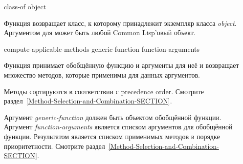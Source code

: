 \begin{defun}[Функция]
class-of object

Функция  возвращает класс, к которому принадлежит экземпляр класса
\emph{object}.
Аргументом для  может быть любой Common Lisp'овый объект.
\end{defun}

\begin{defun}[Функция]
compute-applicable-methods generic-function function-arguments

Функция  принимает обобщённую функцию и
аргументы для неё и возвращает множество методов, которые применимы для данных
аргументов.

Методы сортируются в соответствии с precedence order.
Смотрите раздел~\ref{Method-Selection-and-Combination-SECTION}.

Аргумент \emph{generic-function} должен быть объектом обобщённой функции.
Аргумент \emph{function-arguments} является списком аргументов для обобщённой
функции.
Результатом является списком применимых методов в порядке приоритетности.
Смотрите раздел~\ref{Method-Selection-and-Combination-SECTION}.
\end{defun}

